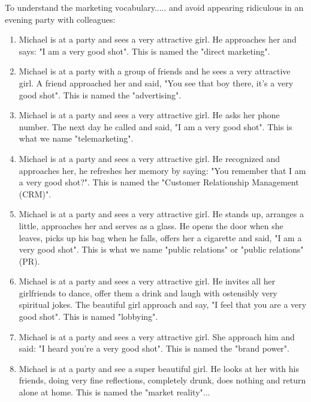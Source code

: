 To understand the marketing vocabulary..... and avoid appearing ridiculous in an evening party with colleagues:
\begin{enumerate}
	\item Michael is at a party and sees a very attractive girl. He approaches her and says: "I am a very good shot". This is named the "direct marketing".

	\item Michael is at a party with a group of friends and he sees a very attractive girl. A friend approached her and said, "You see that boy there, it's a very good shot". This is named the "advertising".

	\item Michael is at a party and sees a very attractive girl. He asks her phone number. The next day he called and said, "I am a very good shot". This is what we name "telemarketing".

	\item Michael is at a party and sees a very attractive girl. He recognized and approaches her, he refreshes her memory by saying: "You remember that I am a very good shot?". This is named the "Customer Relationship Management (CRM)".

	\item Michael is at a party and sees a very attractive girl. He stands up, arranges a little, approaches her and serves as a glass. He opens the door when she leaves, picks up his bag when he falls, offers her a cigarette and said, "I am a very good shot". This is what we name "public relations" or "public relations" (PR).

	\item Michael is at a party and sees a very attractive girl. He invites all her girlfriends to dance, offer them a drink and laugh with ostensibly very spiritual jokes. The beautiful girl approach and say, "I feel that you are a very good shot". This is named "lobbying".

	\item Michael is at a party and sees a very attractive girl. She approach him and said: "I heard you're a very good shot". This is named the "brand power".

	\item Michael is at a party and see a super beautiful girl. He looks at her with his friends, doing very fine reflections, completely drunk, does nothing and return alone at home. This is named the "market reality"...
\end{enumerate}

